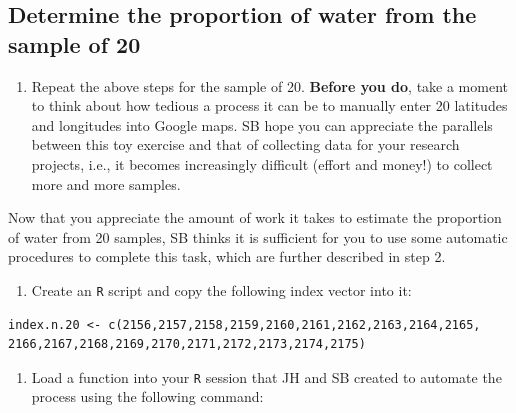 \documentclass[letterpaper,12pt,twoside,]{pinp}
\providecommand{\tightlist}{%
  \setlength{\itemsep}{0pt}\setlength{\parskip}{0pt}}
\begin{document}
\hypertarget{determine-the-proportion-of-water-from-the-sample-of-20}{%
\subsection{Determine the proportion of water from the sample of
20}\label{determine-the-proportion-of-water-from-the-sample-of-20}}

\begin{enumerate}
\def\labelenumi{\arabic{enumi}.}
\tightlist
\item
  Repeat the above steps for the sample of 20. \textbf{Before you do},
  take a moment to think about how tedious a process it can be to
  manually enter 20 latitudes and longitudes into Google maps. SB hope
  you can appreciate the parallels between this toy exercise and that of
  collecting data for your research projects, i.e., it becomes
  increasingly difficult (effort and money!) to collect more and more
  samples.
\end{enumerate}

Now that you appreciate the amount of work it takes to estimate the
proportion of water from 20 samples, SB thinks it is sufficient for you
to use some automatic procedures to complete this task, which are
further described in step 2.

\begin{enumerate}
\def\labelenumi{\arabic{enumi}.}
\setcounter{enumi}{1}
\tightlist
\item
  Create an \texttt{R} script and copy the following index vector into
  it:
\end{enumerate}

\begin{ShadedResult}
\begin{verbatim}
index.n.20 <- c(2156,2157,2158,2159,2160,2161,2162,2163,2164,2165,
2166,2167,2168,2169,2170,2171,2172,2173,2174,2175)
\end{verbatim}
\end{ShadedResult}

\begin{enumerate}
\def\labelenumi{\arabic{enumi}.}
\setcounter{enumi}{2}
\tightlist
\item
  Load a function into your \texttt{R} session that JH and SB created to
  automate the process using the following command:
\end{enumerate}

\begin{Shaded}
\begin{Highlighting}[]
\NormalTok{(}\NormalTok{)}
\end{Highlighting}
\end{Shaded}
\end{document}
